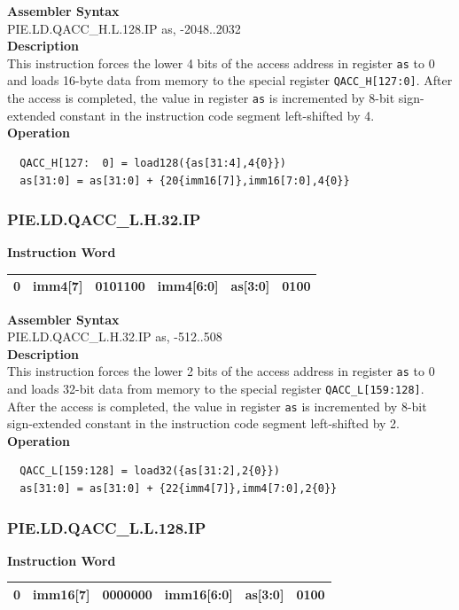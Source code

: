 \textbf{Assembler Syntax} \\
PIE.LD.QACC\_H.L.128.IP as, -2048..2032 \\
\textbf{Description} \\
This instruction forces the lower 4 bits of the access address in register \lstinline{as} to 0 and loads 16-byte data from memory to the special register \lstinline{QACC_H[127:0]}. After the access is completed, the value in register \lstinline{as} is incremented by 8-bit sign-extended constant in the instruction code segment left-shifted by 4.\\
\textbf{Operation}
\begin{lstlisting}
  QACC_H[127:  0] = load128({as[31:4],4{0}})
  as[31:0] = as[31:0] + {20{imm16[7]},imm16[7:0],4{0}}
\end{lstlisting}

\newpage
\subsubsection{PIE.LD.QACC\_L.H.32.IP}\label{instruction:PIELDQACCLH32IP}
\setlength\tabcolsep{6pt}
\textbf{Instruction Word} \\
\begin{tabular}{|c|c|c|c|c|c|}
	\hline
	0 & imm4[7] & 0101100 & imm4[6:0] & as[3:0] & 0100 \\
	\hline
\end{tabular}

\textbf{Assembler Syntax} \\
PIE.LD.QACC\_L.H.32.IP as, -512..508 \\
\textbf{Description} \\
This instruction forces the lower 2 bits of the access address in register \lstinline{as} to 0 and loads 32-bit data from memory to the special register \lstinline{QACC_L[159:128]}. After the access is completed, the value in register \lstinline{as} is incremented by 8-bit sign-extended constant in the instruction code segment left-shifted by 2.\\
\textbf{Operation}
\begin{lstlisting}
  QACC_L[159:128] = load32({as[31:2],2{0}})
  as[31:0] = as[31:0] + {22{imm4[7]},imm4[7:0],2{0}}
\end{lstlisting}

\newpage
\subsubsection{PIE.LD.QACC\_L.L.128.IP}\label{instruction:PIELDQACCLL128IP}
\setlength\tabcolsep{6pt}
\textbf{Instruction Word} \\
\begin{tabular}{|c|c|c|c|c|c|}
	\hline
	0 & imm16[7] & 0000000 & imm16[6:0] & as[3:0] & 0100 \\
	\hline
\end{tabular}

